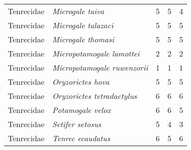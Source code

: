 \begin{tabular}[t]{l l c c c}
Tenrecidae & \textit{Microgale taiva} & 5 & 5 & 4 \\
Tenrecidae & \textit{Microgale talazaci} & 5 & 5 & 5\\
Tenrecidae & \textit{Microgale thomasi} & 5 & 5 & 5\\
Tenrecidae & \textit{Micropotamogale lamottei} & 2 & 2 & 2\\
Tenrecidae & \textit{Micropotamogale ruwenzorii} & 1 & 1 & 1\\
Tenrecidae & \textit{Oryzorictes hova} & 5 & 5 & 5 \\
Tenrecidae & \textit{Oryzorictes tetradactylus} & 6 & 6 & 6\\
Tenrecidae & \textit{Potamogale velox} & 6 & 6 & 5\\
Tenrecidae & \textit{Setifer setosus} & 5 & 4 & 3\\
Tenrecidae & \textit{Tenrec ecaudatus} & 6 & 5 & 6\\
\hline
\end{tabular}
